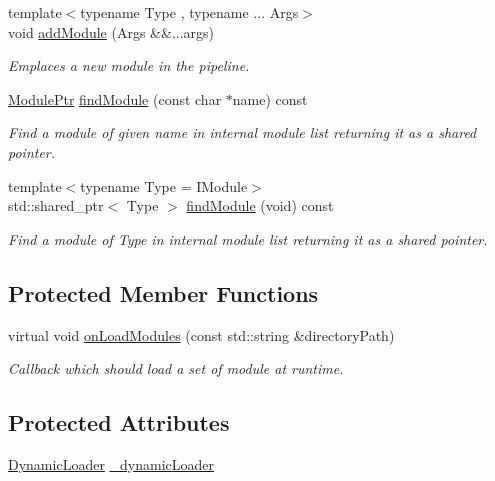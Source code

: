 \begin{DoxyCompactItemize}
{\footnotesize template$<$typename Type , typename ... Args$>$ }\\void \mbox{\hyperlink{classo_z_1_1_pipeline_a797f98947aace930fbb15cd6b2d9f726}{add\+Module}} (Args \&\&...args)
\begin{DoxyCompactList}\small\item\em Emplaces a new module in the pipeline. \end{DoxyCompactList}\item 
\mbox{\hyperlink{namespaceo_z_af5a56aaaee027504979038f38991adcf}{Module\+Ptr}} \mbox{\hyperlink{classo_z_1_1_pipeline_aa8aa56af891b2d889e7c21198daa1451}{find\+Module}} (const char $\ast$name) const
\begin{DoxyCompactList}\small\item\em Find a module of given name in internal module list returning it as a shared pointer. \end{DoxyCompactList}\item 
{\footnotesize template$<$typename Type  = I\+Module$>$ }\\std\+::shared\+\_\+ptr$<$ Type $>$ \mbox{\hyperlink{classo_z_1_1_pipeline_a4f1abc0f7c0985dbc859cd5b20082998}{find\+Module}} (void) const
\begin{DoxyCompactList}\small\item\em Find a module of Type in internal module list returning it as a shared pointer. \end{DoxyCompactList}\end{DoxyCompactItemize}
\subsection*{Protected Member Functions}
\begin{DoxyCompactItemize}
\item 
virtual void \mbox{\hyperlink{classo_z_1_1_pipeline_a0265d90a5540e69b25069d5d96973c53}{on\+Load\+Modules}} (const std\+::string \&directory\+Path)
\begin{DoxyCompactList}\small\item\em Callback which should load a set of module at runtime. \end{DoxyCompactList}\end{DoxyCompactItemize}
\subsection*{Protected Attributes}
\begin{DoxyCompactItemize}
\item 
\mbox{\hyperlink{classo_z_1_1_dynamic_loader}{Dynamic\+Loader}} \mbox{\hyperlink{classo_z_1_1_pipeline_a6412859211177d78f0eebcecda79e841}{\+\_\+dynamic\+Loader}}
\end{DoxyCompactItemize}


